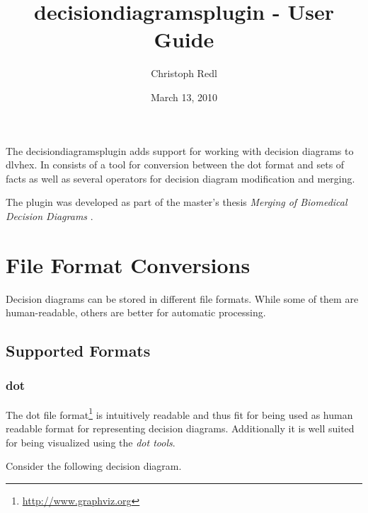 \documentclass[a4paper,11pt]{article}
\theoremstyle{definition}
\newcommand{\dlvhex}{\textsf{dlvhex}\xspace }
\newcommand{\dotff}{\textsf{dot}\xspace }
\newcommand{\DrawDD}
	{
		\tikzset{edge from parent/.style=
		  {draw,
		  ->,
		   edge from parent path={(\tikzparentnode) -- (\tikzchildnode)}}} 
		\tikzset{every node/.style={draw, rectangle, rounded corners=1mm, minimum width=1cm}}
		\tikzset{every leaf node/.style={draw, rectangle, rounded corners=0mm}}
		\tikzset{level distance=1.2cm}
		\tikzset{el/.style={auto,draw=none}}	%
	}
\begin{document}
	\title{decisiondiagramsplugin - User Guide}
	\date{March 13, 2010}
	\author{Christoph Redl}
	\maketitle

	The decisiondiagramsplugin adds support for working with decision diagrams to \dlvhex. In consists of a tool for conversion between the \dotff format and sets of facts as well as
	several operators for decision diagram modification and merging.
	
	The plugin was developed as part of the master's thesis \emph{Merging of Biomedical Decision Diagrams} \cite{CR10DD}.

	
	\section{File Format Conversions}
	\label{sec:Conversion}

		Decision diagrams can be stored in different file formats. While some of them are human-readable, others are better for automatic processing.
		
		\subsection{Supported Formats}

			\subsubsection{\dotff}

				The \dotff file format\footnote{\url{http://www.graphviz.org}} is intuitively readable and thus fit for being used as human readable format for representing decision diagrams.
				Additionally it is well suited for being visualized using the \emph{\dotff tools}.
			
				Consider the following decision diagram.
				
				\begin{minipage}[t]{1.00\textwidth}
					\label{fig:DecisionDiagram}
					\center
				\end{minipage}
				
\end{document}
